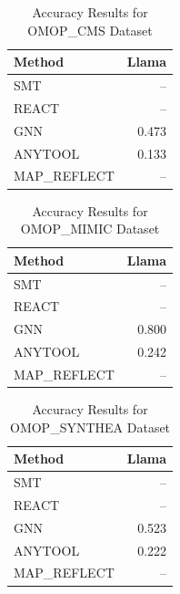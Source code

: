 
\begin{table}[htbp]
\centering
\caption{Accuracy Results for OMOP_CMS Dataset}
\label{tab:omop_cms_accuracy}
\begin{tabular}{lr}
\toprule
\textbf{Method} & \textbf{Llama} \\
\midrule
SMT & -- \\
REACT & -- \\
GNN & 0.473 \\
ANYTOOL & 0.133 \\
MAP_REFLECT & -- \\
\bottomrule
\end{tabular}
\end{table}

\begin{table}[htbp]
\centering
\caption{Accuracy Results for OMOP_MIMIC Dataset}
\label{tab:omop_mimic_accuracy}
\begin{tabular}{lr}
\toprule
\textbf{Method} & \textbf{Llama} \\
\midrule
SMT & -- \\
REACT & -- \\
GNN & 0.800 \\
ANYTOOL & 0.242 \\
MAP_REFLECT & -- \\
\bottomrule
\end{tabular}
\end{table}

\begin{table}[htbp]
\centering
\caption{Accuracy Results for OMOP_SYNTHEA Dataset}
\label{tab:omop_synthea_accuracy}
\begin{tabular}{lr}
\toprule
\textbf{Method} & \textbf{Llama} \\
\midrule
SMT & -- \\
REACT & -- \\
GNN & 0.523 \\
ANYTOOL & 0.222 \\
MAP_REFLECT & -- \\
\bottomrule
\end{tabular}
\end{table}

